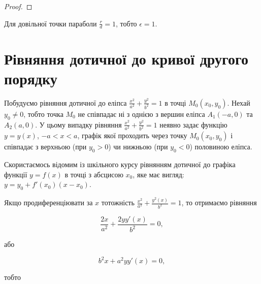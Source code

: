 \begin{proof}
	
\end{proof}

\begin{remark}
	 Для довільної точки параболи $\frac{r}{d} = 1$, тобто $\epsilon = 1$. 
\end{remark}

\section{Рівняння дотичної до кривої другого порядку}

Побудуємо рівняння дотичної до еліпса $\frac{x^2}{a^2} + \frac{y^2}{b^2} = 1$ в точці $M_0(x_0,y_0)$.
Нехай $y_0 \neq 0$, тобто точка $M_0$ не співпадає ні з однією з вершин еліпса $A_1(-a,0)$
та $A_2(a,0)$. У цьому випадку рівняння $\frac{x^2}{a^2} + \frac{y^2}{b^2} = 1$ неявно задає функцію $y = y(x)$,
$-a < x < a$, графік якої проходить через точку $M_0(x_0,y_0)$ і співпадає з верхньою
(при $y_0 > 0$) чи нижньою (при $y_0 < 0$) половиною еліпса.

Скористаємось відомим із шкільного курсу рівнянням дотичної до графіка
функції $y = f(x)$ в точці з абсцисою $x_0$, яке має вигляд: $y = y_0 + f'(x_0)(x - x_0)$.

Якщо продиференціювати за $x$ тотожність $\frac{x^2}{a^2} + \frac{y^2(x)}{b^2} = 1$, то отримаємо
рівняння 

$$\frac{2x}{a^2} + \frac{2yy'(x)}{b^2} = 0,$$ 

\begin{center}
або
\end{center}

$$b^2x + a^2yy'(x) = 0,$$

\begin{center}
тобто 
\end{center}

